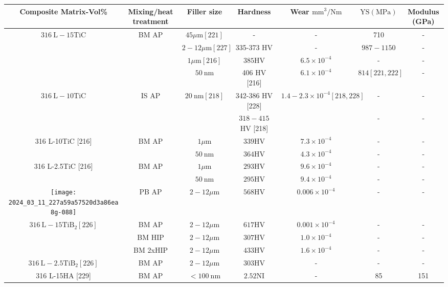 \documentclass[10pt]{article}
\begin{document}
\begin{center}
\begin{tabular}{|c|c|c|c|c|c|c|}
\hline
Composite Matrix-Vol\% & Mixing/heat treatment & Filler size & Hardness & Wear $\mathrm{mm}^{3} / \mathrm{Nm}$ & $\mathrm{YS}(\mathrm{MPa})$ & Modulus (GPa) \\
\hline
\multirow[t]{4}{*}{$316 \mathrm{~L}-15 \mathrm{TiC}$} & BM AP & $45 \mu \mathrm{m}[221]$ & - & - & 710 & - \\
\hline
 &  & $2-12 \mu \mathrm{m}[227]$ & 335-373 HV & - & $987-1150$ & - \\
\hline
 &  & $1 \mu \mathrm{m}[216]$ & $385 \mathrm{HV}$ & $6.5 \times 10^{-4}$ & - & - \\
\hline
 &  & $50 \mathrm{~nm}$ & 406 HV [216] & $6.1 \times 10^{-4}$ & $814[221,222]$ & - \\
\hline
\multirow[t]{2}{*}{$316 \mathrm{~L}-10 \mathrm{TiC}$} & IS AP & $20 \mathrm{~nm}[218]$ & 342-386 HV [228] & $1.4-2.3 \times 10^{-4}[218,228]$ & - & - \\
\hline
 &  &  & $318-415$ HV [218] &  & - & - \\
\hline
\multirow[t]{2}{*}{316 L-10TiC [216]} & BM AP & $1 \mu \mathrm{m}$ & $339 \mathrm{HV}$ & $7.3 \times 10^{-4}$ & - & - \\
\hline
 &  & $50 \mathrm{~nm}$ & $364 \mathrm{HV}$ & $4.3 \times 10^{-4}$ & - & - \\
\hline
\multirow[t]{2}{*}{316 L-2.5TiC [216]} & BM AP & $1 \mu \mathrm{m}$ & $293 \mathrm{HV}$ & $9.6 \times 10^{-4}$ & - & - \\
\hline
 &  & $50 \mathrm{~nm}$ & $295 \mathrm{HV}$ & $9.4 \times 10^{-4}$ & - & - \\
\hline
\texttt{[image: 2024\_03\_11\_227a59a57520d3a86ea8g-088]}
 & PB AP & $2-12 \mu \mathrm{m}$ & $568 \mathrm{HV}$ & $0.006 \times 10^{-4}$ & - & - \\
\hline
\multirow[t]{3}{*}{$316 \mathrm{~L}-15 \mathrm{TiB}_{2}[226]$} & BM AP & $2-12 \mu \mathrm{m}$ & $617 \mathrm{HV}$ & $0.001 \times 10^{-4}$ & - & - \\
\hline
 & BM HIP & $2-12 \mu \mathrm{m}$ & $307 \mathrm{HV}$ & $1.0 \times 10^{-4}$ & - & - \\
\hline
 & BM 2xHIP & $2-12 \mu \mathrm{m}$ & $433 \mathrm{HV}$ & $1.6 \times 10^{-4}$ & - & - \\
\hline
$316 \mathrm{~L}-2.5 \mathrm{TiB}_{2}[226]$ & BM AP & $2-12 \mu \mathrm{m}$ & $303 \mathrm{HV}$ & - & - & - \\
\hline
316 L-15HA [229] & BM AP & $<100 \mathrm{~nm}$ & $2.52 \mathrm{NI}$ & - & 85 & 151 \\

\end{tabular}
\end{center}
\end{document}
